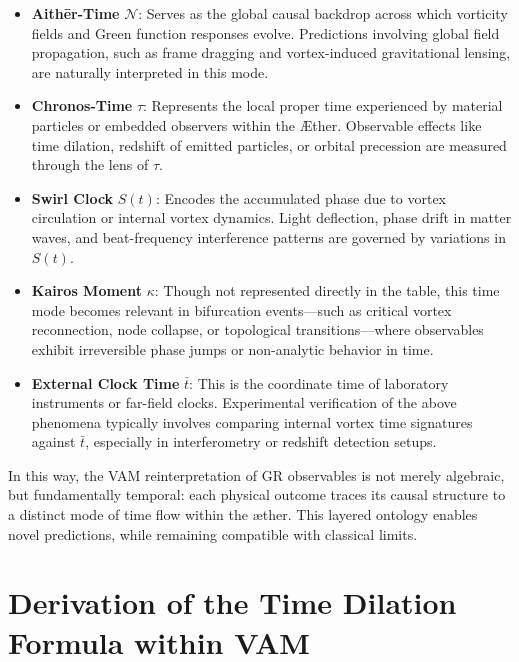 \documentclass[preprint]{revtex4-2}
\begin{document}
\begin{itemize}
    \item \textbf{Aithēr-Time} \( \mathcal{N} \): Serves as the global causal backdrop across which vorticity fields and Green function responses evolve. Predictions involving global field propagation, such as frame dragging and vortex-induced gravitational lensing, are naturally interpreted in this mode.

    \item \textbf{Chronos-Time} \( \tau \): Represents the local proper time experienced by material particles or embedded observers within the Æther. Observable effects like time dilation, redshift of emitted particles, or orbital precession are measured through the lens of \( \tau \).

    \item \textbf{Swirl Clock} \( S(t) \): Encodes the accumulated phase due to vortex circulation or internal vortex dynamics. Light deflection, phase drift in matter waves, and beat-frequency interference patterns are governed by variations in \( S(t) \).

    \item \textbf{Kairos Moment} \( \kappa \): Though not represented directly in the table, this time mode becomes relevant in bifurcation events—such as critical vortex reconnection, node collapse, or topological transitions—where observables exhibit irreversible phase jumps or non-analytic behavior in time.

    \item \textbf{External Clock Time} \( \bar{t} \): This is the coordinate time of laboratory instruments or far-field clocks. Experimental verification of the above phenomena typically involves comparing internal vortex time signatures against \( \bar{t} \), especially in interferometry or redshift detection setups.
\end{itemize}

\noindent
In this way, the VAM reinterpretation of GR observables is not merely algebraic, but fundamentally temporal: each physical outcome traces its causal structure to a distinct mode of time flow within the \ae ther. This layered ontology enables novel predictions, while remaining compatible with classical limits.
\section{Derivation of the Time Dilation Formula within VAM}
\label{sec:appendix:1}
\end{document}
